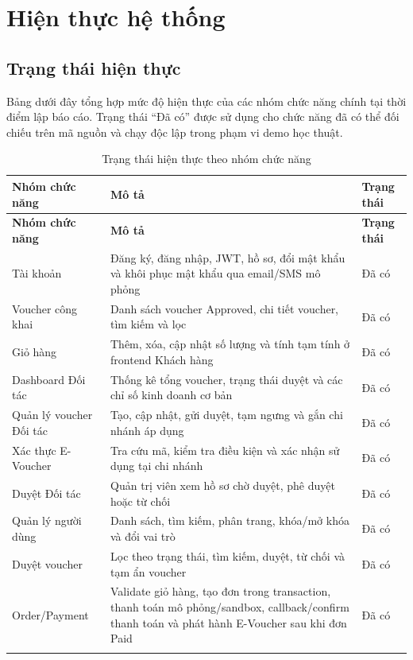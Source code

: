 \chapter{Hiện thực hệ thống}

\section{Trạng thái hiện thực}

Bảng dưới đây tổng hợp mức độ hiện thực của các nhóm chức năng chính tại thời điểm lập báo cáo. Trạng thái ``Đã có'' được sử dụng cho chức năng đã có thể đối chiếu trên mã nguồn và chạy độc lập trong phạm vi demo học thuật.

\begin{longtable}{|p{3.5cm}|p{7.0cm}|p{3.2cm}|}
\hline
\textbf{Nhóm chức năng} & \textbf{Mô tả} & \textbf{Trạng thái} \\ \hline
\endfirsthead
\hline
\textbf{Nhóm chức năng} & \textbf{Mô tả} & \textbf{Trạng thái} \\ \hline
\endhead
Tài khoản & Đăng ký, đăng nhập, JWT, hồ sơ, đổi mật khẩu và khôi phục mật khẩu qua email/SMS mô phỏng & Đã có \\ \hline
Voucher công khai & Danh sách voucher Approved, chi tiết voucher, tìm kiếm và lọc & Đã có \\ \hline
Giỏ hàng & Thêm, xóa, cập nhật số lượng và tính tạm tính ở frontend Khách hàng & Đã có \\ \hline
Dashboard Đối tác & Thống kê tổng voucher, trạng thái duyệt và các chỉ số kinh doanh cơ bản & Đã có \\ \hline
Quản lý voucher Đối tác & Tạo, cập nhật, gửi duyệt, tạm ngưng và gắn chi nhánh áp dụng & Đã có \\ \hline
Xác thực E-Voucher & Tra cứu mã, kiểm tra điều kiện và xác nhận sử dụng tại chi nhánh & Đã có \\ \hline
Duyệt Đối tác & Quản trị viên xem hồ sơ chờ duyệt, phê duyệt hoặc từ chối & Đã có \\ \hline
Quản lý người dùng & Danh sách, tìm kiếm, phân trang, khóa/mở khóa và đổi vai trò & Đã có \\ \hline
Duyệt voucher & Lọc theo trạng thái, tìm kiếm, duyệt, từ chối và tạm ẩn voucher & Đã có \\ \hline
Order/Payment & Validate giỏ hàng, tạo đơn trong transaction, thanh toán mô phỏng/sandbox, callback/confirm thanh toán và phát hành E-Voucher sau khi đơn Paid & Đã có \\ \hline
\caption[]{Trạng thái hiện thực theo nhóm chức năng}\\
\end{longtable}

